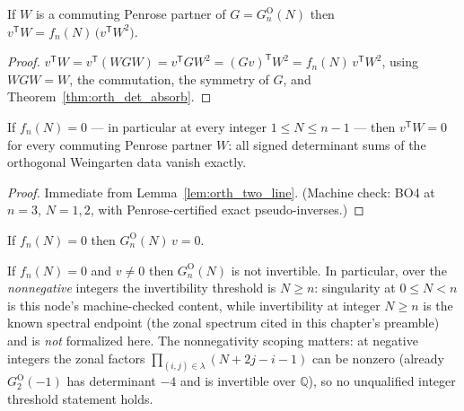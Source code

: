 \begin{lemma}\label{lem:orth_two_line}
\leanok
{}
If $W$ is a commuting Penrose partner of $G = G^{\mathrm O}_n(N)$ then
$v^{\mathsf T}W = f_n(N)\,\bigl(v^{\mathsf T}W^2\bigr)$.
\end{lemma}

\begin{proof}
\leanok
$v^{\mathsf T}W = v^{\mathsf T}(WGW) = v^{\mathsf T}GW^2
= (Gv)^{\mathsf T}W^2 = f_n(N)\,v^{\mathsf T}W^2$, using $WGW=W$, the
commutation, the symmetry of $G$, and Theorem~\ref{thm:orth_det_absorb}.
\end{proof}

\begin{theorem}\label{thm:orth_det_vanish}
\leanok
{}
If $f_n(N)=0$ --- in particular at every integer $1\le N\le n-1$ --- then
$v^{\mathsf T}W = 0$ for every commuting Penrose partner $W$: all signed
determinant sums of the orthogonal Weingarten data vanish exactly.
\end{theorem}

\begin{proof}
\leanok
Immediate from Lemma~\ref{lem:orth_two_line}. (Machine check: BO4 at
$n=3$, $N=1,2$, with Penrose-certified exact pseudo-inverses.)
\end{proof}

\begin{theorem}\label{thm:orth_ker_witness}
\leanok
{}
If $f_n(N)=0$ then $G^{\mathrm O}_n(N)\,v = 0$.
\end{theorem}

\begin{theorem}\label{thm:orth_not_unit}
\leanok
{}
If $f_n(N)=0$ and $v\ne 0$ then $G^{\mathrm O}_n(N)$ is not invertible.
In particular, over the \emph{nonnegative} integers the invertibility
threshold is $N\ge n$: singularity at $0\le N<n$ is this node's
machine-checked content, while invertibility at integer $N\ge n$ is the
known spectral endpoint (the zonal spectrum cited in this chapter's
preamble) and is \emph{not} formalized here. The nonnegativity scoping
matters: at negative integers the zonal factors
$\prod_{(i,j)\in\lambda}(N+2j-i-1)$ can be nonzero (already
$G^{\mathrm O}_2(-1)$ has determinant $-4$ and is invertible over
$\mathbb Q$), so no unqualified integer threshold statement holds.
\end{theorem}

